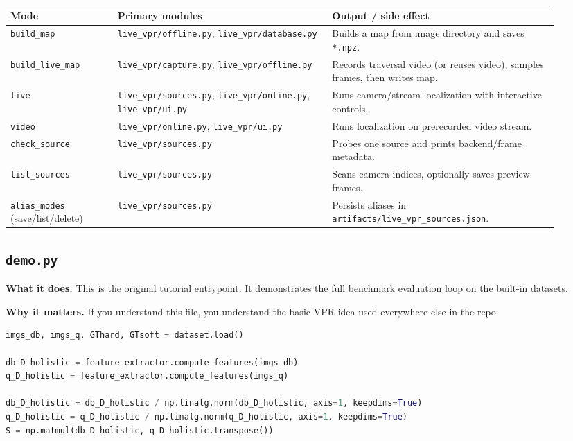 \documentclass[11pt]{article}
\newcommand{\file}[1]{\texttt{#1}}
\begin{document}
\begin{longtable}{p{0.18\linewidth} p{0.36\linewidth} p{0.38\linewidth}}
\toprule
\textbf{Mode} & \textbf{Primary modules} & \textbf{Output / side effect} \\
\midrule
\file{build\_map} & \file{live\_vpr/offline.py}, \file{live\_vpr/database.py} & Builds a map from image directory and saves \file{*.npz}. \\
\file{build\_live\_map} & \file{live\_vpr/capture.py}, \file{live\_vpr/offline.py} & Records traversal video (or reuses video), samples frames, then writes map. \\
\file{live} & \file{live\_vpr/sources.py}, \file{live\_vpr/online.py}, \file{live\_vpr/ui.py} & Runs camera/stream localization with interactive controls. \\
\file{video} & \file{live\_vpr/online.py}, \file{live\_vpr/ui.py} & Runs localization on prerecorded video stream. \\
\file{check\_source} & \file{live\_vpr/sources.py} & Probes one source and prints backend/frame metadata. \\
\file{list\_sources} & \file{live\_vpr/sources.py} & Scans camera indices, optionally saves preview frames. \\
\file{alias\_modes} (save/list/delete) & \file{live\_vpr/sources.py} & Persists aliases in \file{artifacts/live\_vpr\_sources.json}. \\
\bottomrule
\end{longtable}

\subsection{\file{demo.py}}
\textbf{What it does.} This is the original tutorial entrypoint. It demonstrates the full benchmark evaluation loop on the built-in datasets.

\textbf{Why it matters.} If you understand this file, you understand the basic VPR idea used everywhere else in the repo.

\begin{lstlisting}[style=repo, language=Python, caption={Core benchmark pattern in \file{demo.py}}]
imgs_db, imgs_q, GThard, GTsoft = dataset.load()

db_D_holistic = feature_extractor.compute_features(imgs_db)
q_D_holistic = feature_extractor.compute_features(imgs_q)

db_D_holistic = db_D_holistic / np.linalg.norm(db_D_holistic, axis=1, keepdims=True)
q_D_holistic = q_D_holistic / np.linalg.norm(q_D_holistic, axis=1, keepdims=True)
S = np.matmul(db_D_holistic, q_D_holistic.transpose())
\end{lstlisting}
\end{document}
